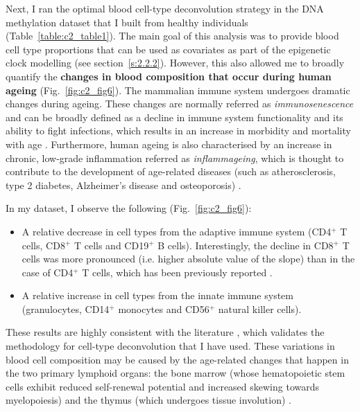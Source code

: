 Next, I ran the optimal blood cell-type deconvolution strategy in the DNA methylation dataset that I built from healthy individuals (Table~\ref{table:c2_table1}). The main goal of this analysis was to provide blood cell type proportions that can be used as covariates as part of the epigenetic clock modelling (see section~\ref{s:2.2.2}). However, this also allowed me to broadly quantify the \textbf{changes in blood composition that occur during human ageing} (Fig.~\ref{fig:c2_fig6}). The mammalian immune system undergoes dramatic changes during ageing. These changes are normally referred as \textit{immunosenescence} and can be broadly defined as a decline in immune system functionality and its ability to fight infections, which results in an increase in morbidity and mortality with age \citep{Nikolich-Zugich2018}. Furthermore, human ageing is also characterised by an increase in chronic, low-grade inflammation referred as \textit{inflammageing}, which is thought to contribute to the development of age-related diseases (such as atherosclerosis, type 2 diabetes, Alzheimer’s disease and osteoporosis) \citep{Franceschi2007}.

\bigskip

In my dataset, I observe the following (Fig.~\ref{fig:c2_fig6}):

\begin{itemize}
	
	\item A relative decrease in cell types from the adaptive immune system (CD4$^+$ T cells, CD8$^+$ T cells and CD19$^+$ B cells). Interestingly, the decline in CD8$^+$ T cells was more pronounced (i.e. higher absolute value of the slope) than in the case of CD4$^+$ T cells, which has been previously reported \citep{Czesnikiewicz-Guzik2008}. 
	
	\item A relative increase in cell types from the innate immune system (granulocytes, CD14$^+$ monocytes and CD56$^+$ natural killer cells).
	
\end{itemize}

These results are highly consistent with the literature \citep{Jaffe2014,Czesnikiewicz-Guzik2008,Kuranda2011,Chen2016a,Seidler2010,Manser2016}, which validates the methodology for cell-type deconvolution that I have used. These variations in blood cell composition may be caused by the age-related changes that happen in the two primary lymphoid organs: the bone marrow (whose hematopoietic stem cells exhibit reduced self-renewal potential and increased skewing towards myelopoiesis) and the thymus (which undergoes tissue involution)  \citep{Chinn2012}. 

